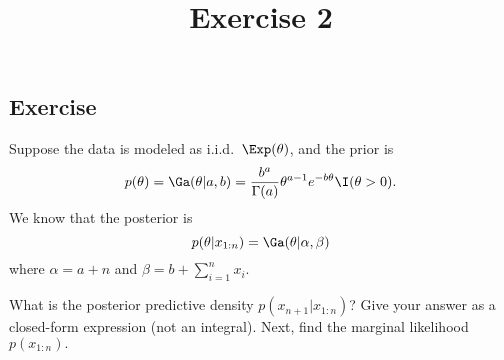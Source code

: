 \documentclass[12pt]{article}
\title{Exercise 2}
\author{}
\date{}
\begin{document}
\maketitle


\subsection*{Exercise}
Suppose the data is modeled as i.i.d.\ $\Exp(\theta)$, and the prior is
$$ p(\theta) =\Ga(\theta|a,b)=\frac{b^a}{\Gamma(a)}\theta^{a-1} e^{-b \theta}\I(\theta>0). $$
We know that the posterior is
$$p(\theta|x_{1:n}) =\Ga(\theta| \alpha,\beta)$$
where $\alpha = a + n$ and $\beta = b +\sum_{i = 1}^n x_i$.

What is the posterior predictive density $p(x_{n+1}|x_{1:n})$?
Give your answer as a closed-form expression (not an integral). Next, find the marginal likelihood $p(x_{1:n}).$
\end{document}
